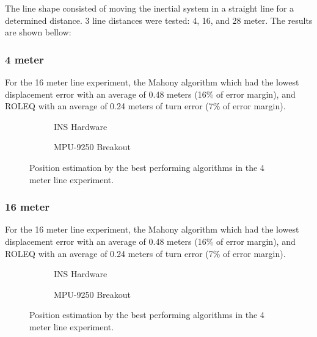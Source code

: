 The line shape consisted of moving the inertial system in a straight line for a determined distance. 3 line distances were tested: 4, 16, and 28 meter. The results are shown bellow:

\subsubsection{4 meter}

For the 16 meter line experiment, the Mahony algorithm which had the lowest displacement error with an average of 0.48 meters (16\% of error margin), and ROLEQ with an average of 0.24 meters of turn error (7\% of error margin).


\begin{figure}[!h]
    \centering
    
\end{figure}

\begin{figure}[!h]
    \centering
    \begin{subfigure}{0.49\textwidth}
        \centering
        \resizebox{1\linewidth}{!}{}
        \caption{INS Hardware}
        \label{fig:square42D}
    \end{subfigure}
    \begin{subfigure}{0.49\textwidth}
        \centering
        \resizebox{1\linewidth}{!}{}
        \caption{MPU-9250 Breakout}
        \label{fig:square43D}
    \end{subfigure}
    \caption{Position estimation by the best performing algorithms in the 4 meter line experiment.}
    \label{fig:square4}
\end{figure}

\subsubsection{16 meter}

For the 16 meter line experiment, the Mahony algorithm which had the lowest displacement error with an average of 0.48 meters (16\% of error margin), and ROLEQ with an average of 0.24 meters of turn error (7\% of error margin).

\begin{figure}[!h]
    \centering
    
\end{figure}

\begin{figure}[!h]
    \centering
    \begin{subfigure}{0.49\textwidth}
        \centering
        \resizebox{1\linewidth}{!}{}
        \caption{INS Hardware}
        \label{fig:square162D}
    \end{subfigure}
    \begin{subfigure}{0.49\textwidth}
        \centering
        \resizebox{1\linewidth}{!}{}
        \caption{MPU-9250 Breakout}
        \label{fig:square163D}
    \end{subfigure}
    \caption{Position estimation by the best performing algorithms in the 4 meter line experiment.}
    \label{fig:square16}
\end{figure}

